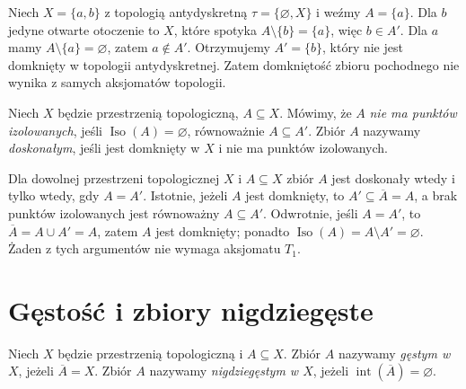 \begin{przyklad}
\label{ex:topog-pochodny-nie-domkniety}
Niech $X=\{a,b\}$ z topologią antydyskretną
$\tau=\{\varnothing,X\}$ i weźmy $A=\{a\}$.
Dla $b$ jedyne otwarte otoczenie to $X$, które spotyka
$A\setminus\{b\}=\{a\}$, więc $b\in A'$.
Dla $a$ mamy $A\setminus\{a\}=\varnothing$, zatem
$a\notin A'$. Otrzymujemy $A'=\{b\}$, który nie jest
domknięty w topologii antydyskretnej.
Zatem domkniętość zbioru pochodnego nie wynika
z samych aksjomatów topologii.
\end{przyklad}

\begin{definicja}
\label{def:topog-doskonaly}
Niech $X$ będzie przestrzenią topologiczną, $A\subseteq X$.
Mówimy, że $A$ \emph{nie ma punktów izolowanych}, jeśli
$\operatorname{Iso}(A)=\varnothing$, równoważnie $A\subseteq A'$.
Zbiór $A$ nazywamy \emph{doskonałym}, jeśli jest domknięty
w $X$ i nie ma punktów izolowanych.
\end{definicja}

\begin{uwaga}
Dla dowolnej przestrzeni topologicznej $X$ i $A\subseteq X$
zbiór $A$ jest doskonały wtedy i tylko wtedy, gdy $A=A'$.
Istotnie, jeżeli $A$ jest domknięty, to
$A'\subseteq\overline A=A$, a brak punktów izolowanych
jest równoważny $A\subseteq A'$. Odwrotnie, jeśli $A=A'$,
to $\overline A=A\cup A'=A$, zatem $A$ jest domknięty;
ponadto $\operatorname{Iso}(A)=A\setminus A'=\varnothing$.
Żaden z tych argumentów nie wymaga aksjomatu $T_1$.
\end{uwaga}

\section{Gęstość i zbiory nigdziegęste}
\label{sec:topog-gestosc}

\begin{definicja}
\label{def:topog-gesty-nigdziegesty}
Niech $X$ będzie przestrzenią topologiczną i $A\subseteq X$.
Zbiór $A$ nazywamy \emph{gęstym w $X$}, jeżeli
$\overline A=X$.
Zbiór $A$ nazywamy \emph{nigdziegęstym w $X$},
jeżeli $\operatorname{int}(\overline A)=\varnothing$.
\end{definicja}

